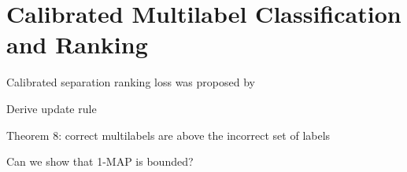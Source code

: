 \section{Calibrated Multilabel Classification and Ranking}

Calibrated separation ranking loss was proposed by \cite{GuoShuurmans11}

Derive update rule

Theorem 8: correct multilabels are above the incorrect set of labels

Can we show that 1-MAP is bounded?
